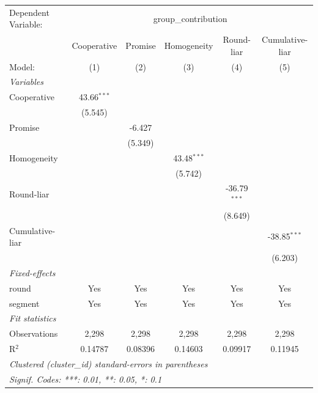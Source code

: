
\begingroup
\centering
\begin{tabular}{lccccc}
   \tabularnewline \midrule \midrule
   Dependent Variable: & \multicolumn{5}{c}{group\_contribution}\\
                   & Cooperative   & Promise & Homogeneity   & Round-liar     & Cumulative-liar \\   
   Model:          & (1)           & (2)     & (3)           & (4)            & (5)\\  
   \midrule
   \emph{Variables}\\
   Cooperative     & 43.66$^{***}$ &         &               &                &   \\   
                   & (5.545)       &         &               &                &   \\   
   Promise         &               & -6.427  &               &                &   \\   
                   &               & (5.349) &               &                &   \\   
   Homogeneity     &               &         & 43.48$^{***}$ &                &   \\   
                   &               &         & (5.742)       &                &   \\   
   Round-liar      &               &         &               & -36.79$^{***}$ &   \\   
                   &               &         &               & (8.649)        &   \\   
   Cumulative-liar &               &         &               &                & -38.85$^{***}$\\   
                   &               &         &               &                & (6.203)\\   
   \midrule
   \emph{Fixed-effects}\\
   round           & Yes           & Yes     & Yes           & Yes            & Yes\\  
   segment         & Yes           & Yes     & Yes           & Yes            & Yes\\  
   \midrule
   \emph{Fit statistics}\\
   Observations    & 2,298         & 2,298   & 2,298         & 2,298          & 2,298\\  
   R$^2$           & 0.14787       & 0.08396 & 0.14603       & 0.09917        & 0.11945\\  
   \midrule \midrule
   \multicolumn{6}{l}{\emph{Clustered (cluster\_id) standard-errors in parentheses}}\\
   \multicolumn{6}{l}{\emph{Signif. Codes: ***: 0.01, **: 0.05, *: 0.1}}\\
\end{tabular}
\par\endgroup


